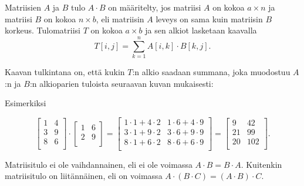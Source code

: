 Matriisien $A$ ja $B$ tulo $A \cdot B$ on määritelty,
jos matriisi $A$ on kokoa $a \times n$
ja matriisi $B$ on kokoa $n \times b$,
eli matriisin $A$ leveys on sama kuin matriisin
$B$ korkeus.
Tulomatriisi $T$
on kokoa $a \times b$
ja sen alkiot lasketaan kaavalla
\[
T[i,j] = \sum_{k=1}^n A[i,k] \cdot B[k,j].
\]

Kaavan tulkintana on, että kukin $T$:n alkio
saadaan summana, joka muodostuu $A$:n ja
$B$:n alkioparien tuloista seuraavan
kuvan mukaisesti:

\begin{center}
\end{center}

Esimerkiksi

\[
 \begin{bmatrix}
  1 & 4 \\
  3 & 9 \\
  8 & 6 \\
 \end{bmatrix}
\cdot
 \begin{bmatrix}
  1 & 6 \\
  2 & 9 \\
 \end{bmatrix}
=
 \begin{bmatrix}
  1 \cdot 1 + 4 \cdot 2 & 1 \cdot 6 + 4 \cdot 9 \\
  3 \cdot 1 + 9 \cdot 2 & 3 \cdot 6 + 9 \cdot 9 \\
  8 \cdot 1 + 6 \cdot 2 & 8 \cdot 6 + 6 \cdot 9 \\
 \end{bmatrix}
=
 \begin{bmatrix}
  9 & 42 \\
  21 & 99 \\
  20 & 102 \\
 \end{bmatrix}.
\]

Matriisitulo ei ole vaihdannainen,
eli ei ole voimassa $A \cdot B = B \cdot A$.
Kuitenkin matriisitulo
on liitännäinen, eli on voimassa $A \cdot (B \cdot C)=(A \cdot B) \cdot C$.

